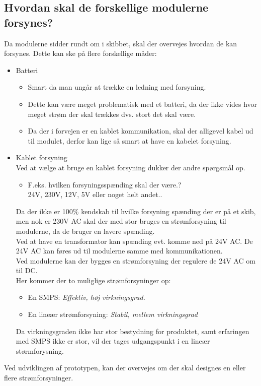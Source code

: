 \subsection{Hvordan skal de forskellige modulerne forsynes?}
Da modulerne sidder rundt om i skibbet, skal der overvejes hvordan de kan forsynes. Dette kan ske på flere forskellige måder:
\begin{itemize}
\item Batteri
	\begin{itemize}
	\item Smart da man ungår at trække en ledning med forsyning.
	\item Dette kan være meget problematisk med et batteri, da der ikke vides hvor meget strøm der skal trækkes dvs. stort det skal være. 
	\item Da der i forvejen er en kablet kommunikation, skal der alligevel kabel ud til modulet, derfor kan lige så smart at have en kabelet forsyning.
	\end{itemize}
\item Kablet forsyning \\
Ved at vælge at bruge en kablet forsyning dukker der andre spørgsmål op.
\begin{itemize}
\item F.eks. hvilken forsyningsspænding skal der være.?\\
24V, 230V, 12V, 5V eller noget helt andet..
\end{itemize}
Da der ikke er 100\% kendskab til hvilke forsyning spænding der er på et skib, men nok er 230V AC skal der med stor bruges en strømforsyning til modulerne, da de bruger en lavere spænding. \\
Ved at have en transformator kan spænding evt. komme ned på 24V AC. De 24V AC kan føres ud til modulerne samme med kommunikationen. \\
Ved modulerne kan der bygges en strømforsyning der regulere de 24V AC om til DC. \\
Her kommer der to muliglige strømforsyninger op:
\begin{itemize}
\item En SMPS: \textit{Effektiv, høj virkningsgrad.}
\item En lineær strømforsyning: \textit{Stabil, mellem virkningsgrad}
\end{itemize}
Da virkningsgraden ikke har stor bestydning for produktet, samt erfaringen med SMPS ikke er stor, vil der tages udgangspunkt i en lineær størmforysning.
\end{itemize}
Ved udviklingen af prototypen, kan der overvejes om der skal designes en eller flere strømforsyninger.


